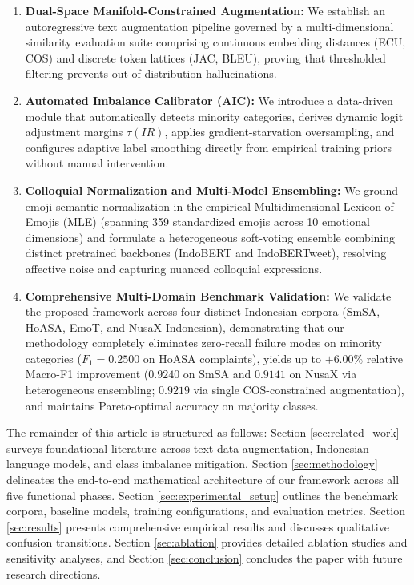 \documentclass{ieeeaccess}
\begin{document}
\begin{enumerate}
    \item \textbf{Dual-Space Manifold-Constrained Augmentation:} We establish an autoregressive text augmentation pipeline governed by a multi-dimensional similarity evaluation suite comprising continuous embedding distances (ECU, COS) and discrete token lattices (JAC, BLEU), proving that thresholded filtering prevents out-of-distribution hallucinations.
    \item \textbf{Automated Imbalance Calibrator (AIC):} We introduce a data-driven module that automatically detects minority categories, derives dynamic logit adjustment margins $\tau(IR)$, applies gradient-starvation oversampling, and configures adaptive label smoothing directly from empirical training priors without manual intervention.
    \item \textbf{Colloquial Normalization and Multi-Model Ensembling:} We ground emoji semantic normalization in the empirical Multidimensional Lexicon of Emojis (MLE) \cite{godard2022multidimensional} (spanning 359 standardized emojis across 10 emotional dimensions) and formulate a heterogeneous soft-voting ensemble combining distinct pretrained backbones (IndoBERT and IndoBERTweet), resolving affective noise and capturing nuanced colloquial expressions.
    \item \textbf{Comprehensive Multi-Domain Benchmark Validation:} We validate the proposed framework across four distinct Indonesian corpora (SmSA, HoASA, EmoT, and NusaX-Indonesian), demonstrating that our methodology completely eliminates zero-recall failure modes on minority categories ($F_1 = 0.2500$ on HoASA complaints), yields up to $+6.00\%$ relative Macro-F1 improvement ($0.9240$ on SmSA and $0.9141$ on NusaX via heterogeneous ensembling; $0.9219$ via single COS-constrained augmentation), and maintains Pareto-optimal accuracy on majority classes.
\end{enumerate}

The remainder of this article is structured as follows: Section \ref{sec:related_work} surveys foundational literature across text data augmentation, Indonesian language models, and class imbalance mitigation. Section \ref{sec:methodology} delineates the end-to-end mathematical architecture of our framework across all five functional phases. Section \ref{sec:experimental_setup} outlines the benchmark corpora, baseline models, training configurations, and evaluation metrics. Section \ref{sec:results} presents comprehensive empirical results and discusses qualitative confusion transitions. Section \ref{sec:ablation} provides detailed ablation studies and sensitivity analyses, and Section \ref{sec:conclusion} concludes the paper with future research directions.
\end{document}
